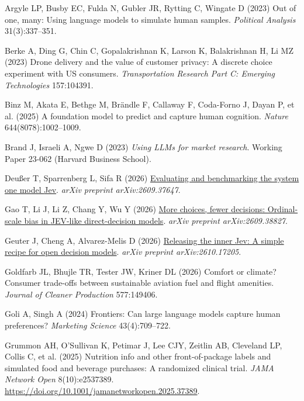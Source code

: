 \documentclass[
  11pt,
  letterpaper,
]{article}
\newlength{\cslhangindent}
\newenvironment{CSLReferences}[2] %
 {\begin{list}{}{%
  \setlength{\itemindent}{0pt}
  \setlength{\leftmargin}{0pt}
  \setlength{\parsep}{0pt}
  \ifodd #1
   \setlength{\leftmargin}{\cslhangindent}
   \setlength{\itemindent}{-1\cslhangindent}
  \fi
  \setlength{\itemsep}{#2\baselineskip}}}
 {\end{list}}
\begin{document}
\protect{}\label{refs}
\begin{CSLReferences}{1}{0}
Argyle LP, Busby EC, Fulda N, Gubler JR, Rytting C, Wingate D (2023) Out
of one, many: Using language models to simulate human samples.
\emph{Political Analysis} 31(3):337--351.

Berke A, Ding G, Chin C, Gopalakrishnan K, Larson K, Balakrishnan H, Li
MZ (2023) Drone delivery and the value of customer privacy: A discrete
choice experiment with US consumers. \emph{Transportation Research Part
C: Emerging Technologies} 157:104391.

{Binz M, Akata E, Bethge M, Brändle F, Callaway F, Coda-Forno J, Dayan
P, et al.} (2025) A foundation model to predict and capture human
cognition. \emph{Nature} 644(8078):1002--1009.

Brand J, Israeli A, Ngwe D (2023) \emph{Using {LLMs} for market
research}. Working Paper 23-062 (Harvard Business School).

Deußer T, Sparrenberg L, Sifa R (2026)
\href{https://arxiv.org/abs/2609.37647}{Evaluating and benchmarking the
system one model {Jev}}. \emph{arXiv preprint arXiv:2609.37647}.

Gao T, Li J, Li Z, Chang Y, Wu Y (2026)
\href{https://arxiv.org/abs/2609.38827}{More choices, fewer decisions:
Ordinal-scale bias in {JEV}-like direct-decision models}. \emph{arXiv
preprint arXiv:2609.38827}.

Geuter J, Cheng A, Alvarez-Melis D (2026)
\href{https://arxiv.org/abs/2610.17205}{Releasing the inner {Jev}: A
simple recipe for open decision models}. \emph{arXiv preprint
arXiv:2610.17205}.

Goldfarb JL, Bhujle TR, Tester JW, Kriner DL (2026) Comfort or climate?
Consumer trade-offs between sustainable aviation fuel and flight
amenities. \emph{Journal of Cleaner Production} 577:149406.

Goli A, Singh A (2024) Frontiers: Can large language models capture
human preferences? \emph{Marketing Science} 43(4):709--722.

Grummon AH, O'Sullivan K, Petimar J, Lee CJY, Zeitlin AB, Cleveland LP,
Collis C, et al. (2025) Nutrition info and other front-of-package labels
and simulated food and beverage purchases: A randomized clinical trial.
\emph{JAMA Network Open} 8(10):e2537389.
\url{https://doi.org/10.1001/jamanetworkopen.2025.37389}.


\end{CSLReferences}
\end{document}
